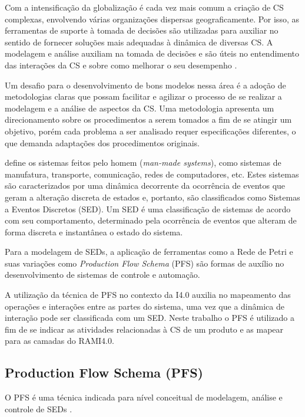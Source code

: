Com a intensificação da globalização é cada vez mais comum a criação de CS complexas, envolvendo várias organizações dispersas geograficamente. Por isso, as ferramentas de suporte à tomada de decisões são utilizadas para auxiliar no sentido de fornecer soluções mais adequadas à dinâmica de diversas CS. A modelagem e análise auxiliam na tomada de decisões e são úteis no entendimento das interações da CS e sobre como melhorar o seu desempenho \cite{oliveira2016supplychain}.

Um desafio para o desenvolvimento de bons modelos nessa área é a adoção de metodologias claras que possam facilitar e agilizar o processo de se realizar a modelagem e a análise de aspectos da CS. Uma metodologia apresenta um direcionamento sobre os procedimentos a serem tomados a fim de se atingir um objetivo, porém cada problema a ser analisado requer especificações diferentes, o que demanda adaptações dos procedimentos originais.

 define os sistemas feitos pelo homem (\textit{man-made systems}), como sistemas de manufatura, transporte, comunicação, redes de computadores, etc. Estes sistemas são caracterizados por uma dinâmica decorrente da ocorrência de eventos que geram a alteração discreta de estados e, portanto, são classificados como Sistemas a Eventos Discretos (SED). Um SED é uma classificação de sistemas de acordo com seu comportamento, determinado pela ocorrência de eventos que alteram de forma discreta e instantânea o estado do sistema.

Para a modelagem de SEDs, a aplicação de ferramentas como a Rede de Petri e suas variações como \textit{Production Flow Schema} (PFS) são formas de auxílio no desenvolvimento de sistemas de controle e automação.

A utilização da técnica de PFS no contexto da I4.0 auxilia no mapeamento das operações e interações entre as partes do sistema, uma vez que a dinâmica de interação pode ser classificada com um SED. Neste trabalho o PFS é utilizado a fim de se indicar as atividades relacionadas à CS de um produto e as mapear para as camadas do RAMI4.0.

\subsection{Production Flow Schema (PFS)}

O PFS é uma técnica indicada para nível conceitual de modelagem, análise e controle de SEDs \cite{miyagi1996controle}.

